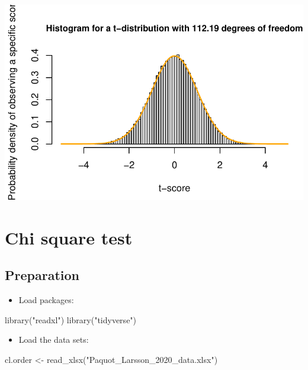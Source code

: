 \documentclass[
  11pt,
  letterpaper,
  DIV=11,
  numbers=noendperiod]{scrreprt}
\newenvironment{Shaded}{\begin{snugshade}}{\end{snugshade}}
\newcommand{\FunctionTok}[1]{\textcolor[rgb]{0.28,0.35,0.67}{#1}}
\newcommand{\NormalTok}[1]{\textcolor[rgb]{0.00,0.23,0.31}{#1}}
\newcommand{\OtherTok}[1]{\textcolor[rgb]{0.00,0.23,0.31}{#1}}
\newcommand{\StringTok}[1]{\textcolor[rgb]{0.13,0.47,0.30}{#1}}
\providecommand{\tightlist}{%
  \setlength{\itemsep}{0pt}\setlength{\parskip}{0pt}}\usepackage{longtable,booktabs,array}
\begin{document}
\includegraphics{Hypothesis_testing_files/figure-pdf/unnamed-chunk-5-1.pdf}

\chapter{Chi square test}\label{chi-square-test}

\section{Preparation}\label{preparation-6}

\begin{itemize}
\tightlist
\item
  Load packages:
\end{itemize}

\begin{Shaded}
\begin{Highlighting}[]
\FunctionTok{library}\NormalTok{(}\StringTok{"readxl"}\NormalTok{)}
\FunctionTok{library}\NormalTok{(}\StringTok{"tidyverse"}\NormalTok{)}
\end{Highlighting}
\end{Shaded}

\begin{itemize}
\tightlist
\item
  Load the data sets:
\end{itemize}

\begin{Shaded}
\begin{Highlighting}[]
\NormalTok{cl.order }\OtherTok{\textless{}{-}} \FunctionTok{read\_xlsx}\NormalTok{(}\StringTok{"Paquot\_Larsson\_2020\_data.xlsx"}\NormalTok{)}
\end{Highlighting}
\end{Shaded}
\end{document}
